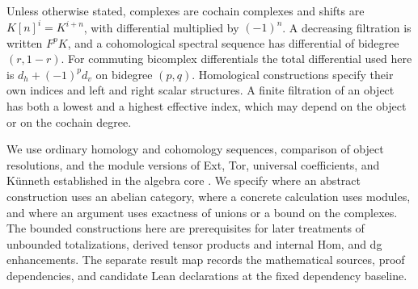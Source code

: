 \documentclass[11pt,oneside,openany]{book}
\theoremstyle{definition}
\theoremstyle{remark}
\begin{document}
Unless otherwise stated, complexes are cochain complexes and shifts are
\(K[n]^i=K^{i+n}\), with differential multiplied by \((-1)^n\).
A decreasing filtration is written \(F^pK\), and a cohomological spectral
sequence has differential of bidegree \((r,1-r)\). For commuting
bicomplex differentials the total differential used here is
\(d_h+(-1)^p d_v\) on bidegree \((p,q)\). Homological constructions specify
their own indices and left and right scalar structures. A finite
filtration of an object has both a lowest and a highest effective index,
which may depend on the object or on the cochain degree.

We use ordinary homology and cohomology sequences, comparison of
object resolutions, and the module versions of Ext, Tor, universal
coefficients, and K\"unneth established in the algebra core
\cite[Chapters 10--11]{p103}. We specify where an abstract construction uses
an abelian category, where a concrete calculation uses modules, and where
an argument uses exactness of unions or a bound on the complexes. The
bounded constructions here are prerequisites for later treatments of
unbounded totalizations, derived tensor products and internal Hom, and dg
enhancements. The separate result map records the mathematical sources,
proof dependencies, and candidate Lean declarations at the fixed dependency
baseline.

\mainmatter







\end{document}
